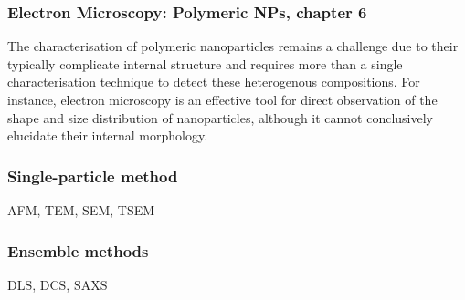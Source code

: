 \subsubsection{Electron Microscopy: Polymeric NPs, chapter 6}
The characterisation of polymeric nanoparticles remains a challenge due to their typically complicate internal structure\citep{beyer_saxs_1990} and requires more than a single characterisation technique to detect these heterogenous compositions. For instance, electron microscopy is an effective tool for direct observation of the shape and size distribution of nanoparticles, although it cannot conclusively elucidate their internal morphology.


\subsubsection{Single-particle method}
AFM, TEM, SEM, TSEM

\subsubsection{Ensemble methods}
DLS, DCS, SAXS


